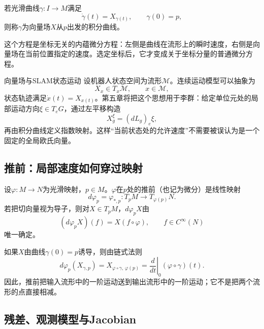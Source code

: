 \begin{definition}[积分曲线]
若光滑曲线$\gamma:I\to M$满足
\[
    \dot\gamma(t)=X_{\gamma(t)},
    \qquad \gamma(0)=p,
\]
则称$\gamma$为向量场$X$从$p$出发的积分曲线。
\end{definition}

这个方程是坐标无关的内蕴微分方程：左侧是曲线在流形上的瞬时速度，右侧是向量场在当前位置指定的速度。选定坐标后，它才变成关于坐标分量的普通微分方程。

\begin{slamcase}{向量场与SLAM状态运动}
设机器人状态空间为流形$\mathcal M$。连续运动模型可以抽象为
\[
    X_x\in T_x\mathcal M,
    \qquad x\in\mathcal M,
\]
状态轨迹满足$\dot x(t)=X_{x(t)}$。第五章将把这个思想用于李群：给定单位元处的局部运动方向$\xi\in T_eG$，通过左平移构造
\[
    X_g^\xi=(dL_g)_e\xi,
\]
再由积分曲线定义指数映射。这样“当前状态处的允许速度”不需要被误认为是一个固定的全局欧氏向量。
\end{slamcase}

\subsection{推前：局部速度如何穿过映射}

\begin{definition}[推前]
设$\varphi:M\to N$为光滑映射，$p\in M$。$\varphi$在$p$处的推前（也记为微分）是线性映射
\[
    d\varphi_p=\varphi_{\ast,p}:T_pM\to T_{\varphi(p)}N.
\]
若把切向量视为导子，则对$X\in T_pM$，$d\varphi_pX$由
\[
    (d\varphi_pX)(f)=X(f\circ\varphi),
    \qquad f\in C^\infty(N)
\]
唯一确定。
\end{definition}

如果$X$由曲线$\gamma(0)=p$诱导，则由链式法则
\[
    d\varphi_p(X_{\gamma,p})
    =X_{\varphi\circ\gamma,\,\varphi(p)}
    =\left.\frac{d}{dt}\right|_{0}(\varphi\circ\gamma)(t).
\]
因此，推前把输入流形中的一阶运动送到输出流形中的一阶运动；它不是把两个流形的点直接相减。

\begin{center}
\end{center}

\subsection{残差、观测模型与Jacobian}

